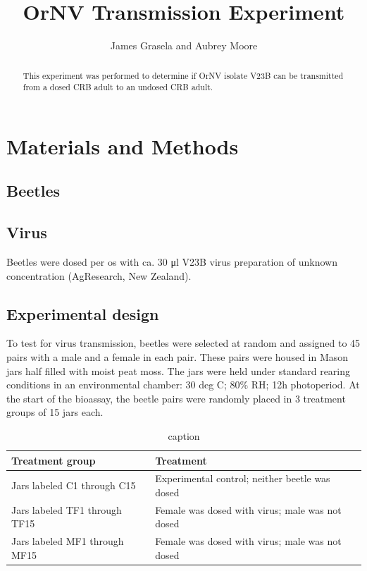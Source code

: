 \documentclass[11pt,letterpaper]{scrartcl}
\begin{document}
\title{OrNV Transmission Experiment}
\author{James Grasela and Aubrey Moore}
\maketitle

\begin{abstract}
This experiment was performed to determine if OrNV isolate V23B can be transmitted from a dosed CRB adult to an undosed CRB 
adult.
\end{abstract}

\section{Materials and Methods}

\subsection{Beetles}

\subsection{Virus}

Beetles were dosed per os with ca. 30 μl V23B virus preparation of unknown concentration (AgResearch, New Zealand).

\subsection{Experimental design}

To test for virus transmission, beetles were selected at random and assigned to 45 pairs with a male and a female 
in each pair. These pairs were housed in Mason jars half filled with moist peat moss. The jars were held under 
standard rearing conditions in an environmental chamber: 30 deg C; 80\% RH; 12h photoperiod. At the start of the 
bioassay, the beetle pairs were randomly placed in 3 treatment groups of 15 jars each. 

\begin{table}[h]
	\centering
\caption{caption}
	
\begin{tabular}{ll}
	\toprule
	Treatment group & Treatment\\
	\midrule
	Jars labeled C1 through C15 & Experimental control; neither beetle was dosed\\
    Jars labeled TF1 through TF15 & Female was dosed with virus; male was not dosed\\
    Jars labeled MF1 through MF15 & Female was dosed with virus; male was not dosed\\
	\bottomrule
\end{tabular} 

\end{table}
\end{document}
